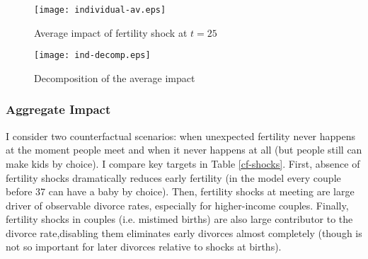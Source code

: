 \documentclass[12pt,letter]{article}
\begin{document}
\begin{figure}[h!]
\centering
\texttt{[image: individual-av.eps]}
\caption{Average impact of fertility shock at $t=25$\label{individual-av}}
\end{figure}

\begin{figure}[h!]
\centering
\texttt{[image: ind-decomp.eps]}
\vspace{-4em}
\caption{Decomposition of the average impact\label{ind-decomp}}
\end{figure}



\subsubsection{Aggregate Impact}
I consider two counterfactual scenarios: when unexpected fertility never happens at the moment people meet and when it never happens at all (but people still can make kids by choice). I compare key targets in Table \ref{cf-shocks}. First, absence of fertility shocks dramatically reduces early fertility (in the model every couple before 37 can have a baby by choice). Then, fertility shocks at meeting are large driver of observable divorce rates, especially for higher-income couples. Finally, fertility shocks in couples (i.e. mistimed births) are also large contributor to the divorce rate,disabling them eliminates early divorces almost completely (though is not so important for later divorces relative to shocks at births). 
\end{document}
